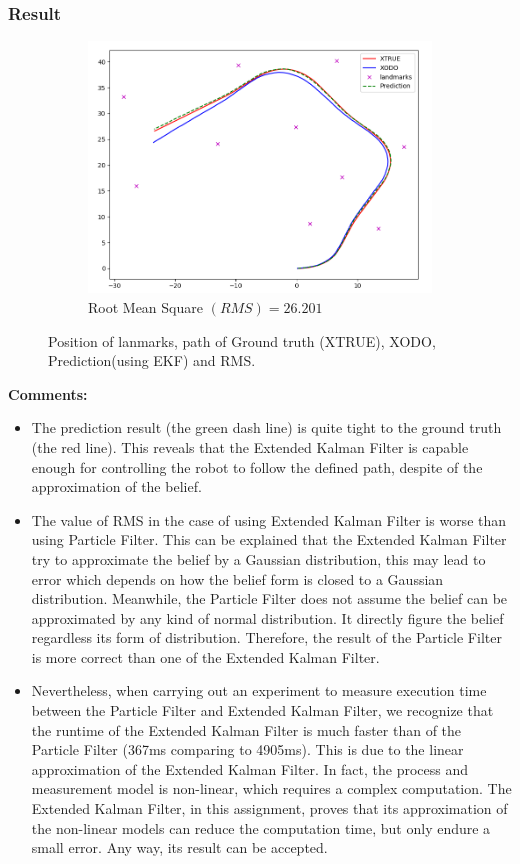 \documentclass{article}
\begin{document}
\subsubsection{Result} 
\begin{figure}[h!]
\centering
\begin{subfigure}[b]{0.8\linewidth}
	\includegraphics[width=\textwidth]{EKF.png}
	\caption{Root Mean Square $(RMS) = 26.201$}\label{fig:image-5}
\end{subfigure}
\caption{Position of lanmarks, path of Ground truth (XTRUE), XODO, Prediction(using EKF) and RMS.}
\end{figure}


\textbf{Comments:}

\begin{itemize}
	\item{The prediction result (the green dash line) is quite tight to the ground truth (the red line). This reveals that the Extended Kalman Filter is capable enough for controlling the robot to follow the defined path, despite of the approximation of the belief.} 
	\item{The value of RMS in the case of using Extended Kalman Filter is worse than using Particle Filter. This can be explained that the Extended Kalman Filter try to approximate the belief by a Gaussian distribution, this may lead to error which depends on how the belief form is closed to a Gaussian distribution. Meanwhile, the Particle Filter does not assume the belief can be approximated by any kind of normal distribution. It directly figure the belief regardless its form of distribution. Therefore, the result of the Particle Filter is more correct than one of the Extended Kalman Filter.}
	\item{Nevertheless, when carrying out an experiment to measure execution time between the Particle Filter and Extended Kalman Filter, we recognize that the runtime of the Extended Kalman Filter is much faster than of the Particle Filter (367ms comparing to 4905ms). This is due to the linear approximation of the Extended Kalman Filter. In fact, the process and measurement model is non-linear, which requires a complex computation. The Extended Kalman Filter, in this assignment, proves that its approximation of the non-linear models can reduce the computation time, but only endure a small error. Any way, its result can be accepted.}
\end{itemize}
\end{document}

